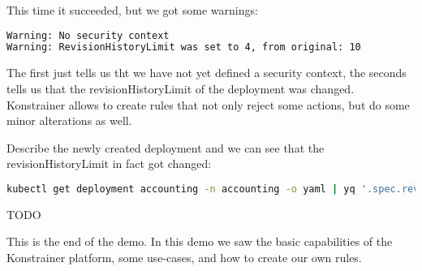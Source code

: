 This time it succeeded, but we got some warnings:

\begin{lstlisting}[caption={TODO},language=bash,label=code:todo]
Warning: No security context
Warning: RevisionHistoryLimit was set to 4, from original: 10
\end{lstlisting}

The first just tells us tht we have not yet defined a security context, the seconds tells us that the revisionHistoryLimit of the deployment was changed. Konstrainer allows to create rules that not only reject some actions, but do some minor alterations as well.

Describe the newly created deployment and we can see that the revisionHistoryLimit in fact got changed:

\begin{lstlisting}[caption={TODO},language=bash,label=code:bashx]
kubectl get deployment accounting -n accounting -o yaml | yq '.spec.revisionHistoryLimit'
\end{lstlisting}


TODO

This is the end of the demo. In this demo we saw the basic capabilities of the Konstrainer platform, some use-cases, and how to create our own rules.
